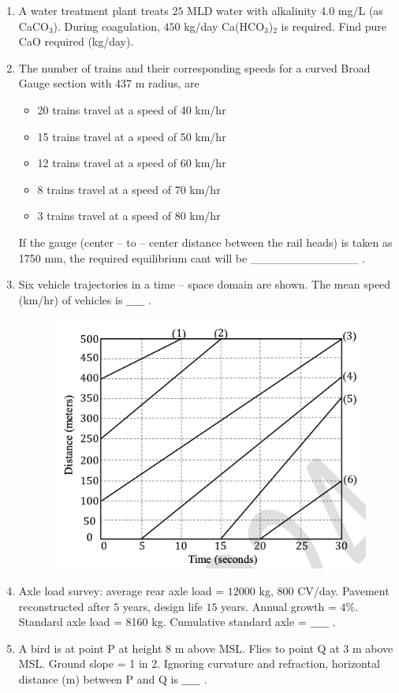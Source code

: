 \documentclass[journal]{IEEEtran}
\begin{document}
\begin{enumerate}
\item A water treatment plant treats $25$ MLD water with alkalinity 4.0 mg/L (as CaCO$_3$). During coagulation, $450$ kg/day Ca(HCO$_3$)$_2$ is required. Find pure CaO required (kg/day).  
\hfill {}  

\item The number of trains and their corresponding speeds for a curved Broad Gauge 
section with 437 m radius, are 

\begin{itemize}
\item 20 trains travel at a speed of 40 km/hr 
\item 15 trains travel at a speed of 50 km/hr 
\item 12 trains travel at a speed of 60 km/hr 
\item 8 trains travel at a speed of 70 km/hr 
\item 3 trains travel at a speed of 80 km/hr 
\end{itemize}
If the gauge (center -- to -- center distance between the rail heads) is taken as 1750 mm, 
the required equilibrium cant  will be \_\_\_\_\_\_\_\_\_\_\_\_\_ .  
\hfill {}


\item Six vehicle trajectories in a time -- space domain are shown. The mean speed (km/hr) of vehicles is $\_\_\_\_\_$ .  
\hfill {}  

\begin{figure}[H][H]
    \centering
    \includegraphics[width=0.6\columnwidth]{figs/Q63.png} 
    \caption{}
    \label{fig:placeholder}
\end{figure}

\item Axle load survey: average rear axle load = $12000$ kg, $800$ CV/day. Pavement reconstructed after $5$ years, design life $15$ years. Annual growth = $4\%$. Standard axle load = 8160 kg. Cumulative standard axle  = $\_\_\_\_\_$ .  
\hfill {}  

\item A bird is at point P at height 8 m above MSL. Flies to point Q at 3 m above MSL. Ground slope = 1 in 2. Ignoring curvature and refraction, horizontal distance (m) between P and Q is $\_\_\_\_\_$ .  
\hfill {}  









\end{enumerate}
\end{document}
